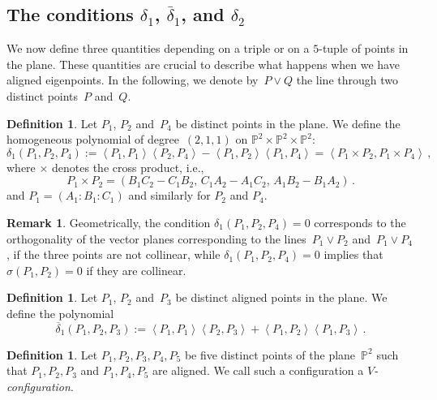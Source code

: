 \documentclass{amsart}
\theoremstyle{plain}
\theoremstyle{definition}
\newtheorem{definition}[lemma]{Definition}
\newtheorem{rmk}[lemma]{Remark}
\newcommand{\p}{\mathbb{P}}
\newcommand{\scl}[2]{\left\langle {#1}, {#2} \right\rangle}
\begin{document}
\subsection{The conditions \texorpdfstring{$\delta_1$}{delta1}, \texorpdfstring{$\bar{\delta}_1$}{deltabar1}, and \texorpdfstring{$\delta_2$}{delta2}}

We now define three quantities depending on a triple or on a $5$-tuple of points in the plane.
These quantities are crucial to describe what happens when we have aligned eigenpoints.
In the following, we denote by~$P \vee Q$ the line through two distinct points~$P$ and~$Q$.

\begin{definition}
\label{definition:delta1}
Let $P_1$, $P_2$ and~$P_4$ be distinct points in the plane.
We define the homogeneous polynomial of degree~$(2,1,1)$ on $\p^2 \times \p^2 \times \p^2$:
%
\[
  \delta_1(P_1, P_2, P_4) :=
  \scl{P_1}{P_1} \scl{P_2}{P_4} - \scl{P_1}{P_2}\scl{P_1}{P_4} =
  \scl{P_1\times P_2}{P_1 \times P_4} \,,
\]
%
where $\times$ denotes the cross product, i.e.,
%
\[
  P_1 \times P_2 = 
  (B_1 C_2 - C_1 B_2, \, C_1 A_2 - A_1 C_2, \, A_1 B_2 - B_1 A_2) \,.
\]
%
and $P_1 = (A_1: B_1: C_1)$ and similarly for $P_2$ and $P_4$.
\end{definition}

\begin{rmk}
\label{rmk:delta1_meaning}
Geometrically, the condition $\delta_1(P_1, P_2, P_4) = 0$ corresponds to the orthogonality of the vector planes corresponding to the lines~$P_1 \vee P_2$ and~$P_1 \vee P_4$, if the three points are not collinear, while
$\delta_1(P_1, P_2, P_4) = 0$ implies that $\sigma (P_1,P_2)=0$ if they are collinear.
\end{rmk}

\begin{definition}
\label{definition:delta1b}
Let $P_1$, $P_2$ and~$P_3$ be distinct aligned points in the plane.
We define the polynomial
%
\[
  \overline{\delta}_1(P_1, P_2, P_3) :=
  \scl{P_1}{P_1} \scl{P_2}{P_3} + \scl{P_1}{P_2}\scl{P_1}{P_3} \,.
\]
%
\end{definition}

\begin{definition}
\label{definition:Vconf}
Let $P_1, P_2, P_3, P_4, P_5$ be five distinct points of the plane~$\p^2$
such that $P_1, P_2, P_3$ and $P_1, P_4, P_5$ are aligned.
We call such a configuration a \emph{$V$-configuration}.
\end{definition}
\end{document}
